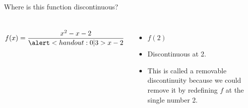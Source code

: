 \begin{frame}
\begin{example}[Example 2a, p. 114]
Where is this function discontinuous?
\begin{columns}[c]
\[
f(x) = \frac{x^2 - x - 2}{\alert<handout:0 |3>{x - 2}}
\]
\ 
\begin{itemize}
\item<2-| alert@2-3>  $f(2)$ 
\item<4->  Discontinuous at 2.
\item<5->  This is called a removable discontinuity because we could remove it by redefining $f$ at the single number 2.
\end{itemize}
\end{columns}
\end{example}
\end{frame}



